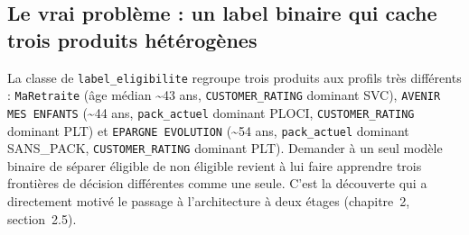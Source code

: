 \documentclass[11pt,a4paper]{report}
\begin{document}
\subsection{Le vrai problème : un label binaire qui cache trois produits hétérogènes}
La classe  \fg{} de \texttt{label\_eligibilite} regroupe trois
produits aux profils très différents : \texttt{MaRetraite} (âge médian
\textasciitilde 43 ans, \texttt{CUSTOMER\_RATING} dominant SVC),
\texttt{AVENIR MES ENFANTS} (\textasciitilde 44 ans, \texttt{pack\_actuel}
dominant PLOCI, \texttt{CUSTOMER\_RATING} dominant PLT) et
\texttt{EPARGNE EVOLUTION} (\textasciitilde 54 ans, \texttt{pack\_actuel}
dominant SANS\_PACK, \texttt{CUSTOMER\_RATING} dominant PLT). Demander à un
seul modèle binaire de séparer \og éligible \fg{} de \og non éligible \fg{}
revient à lui faire apprendre trois frontières de décision différentes
comme une seule. C'est la découverte qui a directement motivé le passage
à l'architecture à deux étages (chapitre~2, section~2.5).
\end{document}
